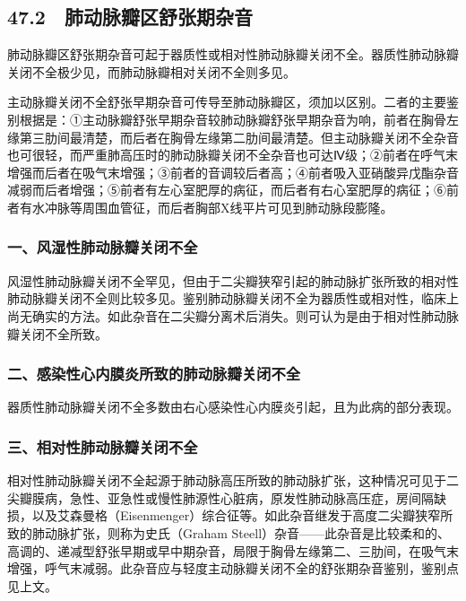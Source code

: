 \subsection{47.2　肺动脉瓣区舒张期杂音}

肺动脉瓣区舒张期杂音可起于器质性或相对性肺动脉瓣关闭不全。器质性肺动脉瓣关闭不全极少见，而肺动脉瓣相对关闭不全则多见。

主动脉瓣关闭不全舒张早期杂音可传导至肺动脉瓣区，须加以区别。二者的主要鉴别根据是：①主动脉瓣舒张早期杂音较肺动脉瓣舒张早期杂音为响，前者在胸骨左缘第三肋间最清楚，而后者在胸骨左缘第二肋间最清楚。但主动脉瓣关闭不全杂音也可很轻，而严重肺高压时的肺动脉瓣关闭不全杂音也可达Ⅳ级；②前者在呼气末增强而后者在吸气末增强；③前者的音调较后者高；④前者吸入亚硝酸异戊酯杂音减弱而后者增强；⑤前者有左心室肥厚的病征，而后者有右心室肥厚的病征；⑥前者有水冲脉等周围血管征，而后者胸部X线平片可见到肺动脉段膨隆。

\subsubsection{一、风湿性肺动脉瓣关闭不全}

风湿性肺动脉瓣关闭不全罕见，但由于二尖瓣狭窄引起的肺动脉扩张所致的相对性肺动脉瓣关闭不全则比较多见。鉴别肺动脉瓣关闭不全为器质性或相对性，临床上尚无确实的方法。如此杂音在二尖瓣分离术后消失。则可认为是由于相对性肺动脉瓣关闭不全所致。

\subsubsection{二、感染性心内膜炎所致的肺动脉瓣关闭不全}

器质性肺动脉瓣关闭不全多数由右心感染性心内膜炎引起，且为此病的部分表现。

\subsubsection{三、相对性肺动脉瓣关闭不全}

相对性肺动脉瓣关闭不全起源于肺动脉高压所致的肺动脉扩张，这种情况可见于二尖瓣膜病，急性、亚急性或慢性肺源性心脏病，原发性肺动脉高压症，房间隔缺损，以及艾森曼格（Eisenmenger）综合征等。如此杂音继发于高度二尖瓣狭窄所致的肺动脉扩张，则称为史氏（Graham
Steell）杂音------此杂音是比较柔和的、高调的、递减型舒张早期或早中期杂音，局限于胸骨左缘第二、三肋间，在吸气末增强，呼气末减弱。此杂音应与轻度主动脉瓣关闭不全的舒张期杂音鉴别，鉴别点见上文。

\protect\hypertarget{text00130.html}{}{}

